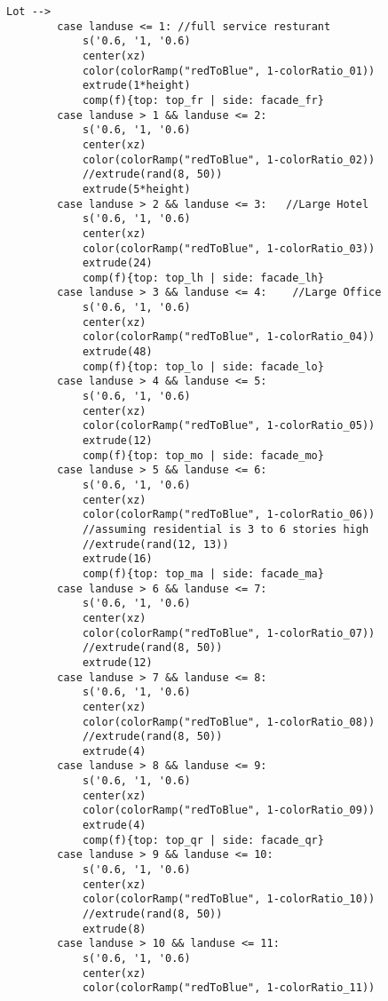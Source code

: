 \begin{multicols}{2}
\begin{verbatim}
Lot -->
        case landuse <= 1: //full service resturant
            s('0.6, '1, '0.6)
            center(xz)
            color(colorRamp("redToBlue", 1-colorRatio_01))
            extrude(1*height)
            comp(f){top: top_fr | side: facade_fr}
        case landuse > 1 && landuse <= 2:       
            s('0.6, '1, '0.6)
            center(xz)
            color(colorRamp("redToBlue", 1-colorRatio_02))
            //extrude(rand(8, 50))
            extrude(5*height)
        case landuse > 2 && landuse <= 3:   //Large Hotel
            s('0.6, '1, '0.6)
            center(xz)      
            color(colorRamp("redToBlue", 1-colorRatio_03))
            extrude(24)
            comp(f){top: top_lh | side: facade_lh}
        case landuse > 3 && landuse <= 4:    //Large Office
            s('0.6, '1, '0.6)
            center(xz)         
            color(colorRamp("redToBlue", 1-colorRatio_04))
            extrude(48)
            comp(f){top: top_lo | side: facade_lo}
        case landuse > 4 && landuse <= 5: 
            s('0.6, '1, '0.6)
            center(xz)
            color(colorRamp("redToBlue", 1-colorRatio_05))
            extrude(12)
            comp(f){top: top_mo | side: facade_mo}            
        case landuse > 5 && landuse <= 6: 
            s('0.6, '1, '0.6)
            center(xz)
            color(colorRamp("redToBlue", 1-colorRatio_06))
            //assuming residential is 3 to 6 stories high
            //extrude(rand(12, 13))
            extrude(16)
            comp(f){top: top_ma | side: facade_ma}          
        case landuse > 6 && landuse <= 7:
            s('0.6, '1, '0.6)
            center(xz)
            color(colorRamp("redToBlue", 1-colorRatio_07))
            //extrude(rand(8, 50))
            extrude(12)
        case landuse > 7 && landuse <= 8: 
            s('0.6, '1, '0.6)
            center(xz)
            color(colorRamp("redToBlue", 1-colorRatio_08))
            //extrude(rand(8, 50))
            extrude(4)
        case landuse > 8 && landuse <= 9: 
            s('0.6, '1, '0.6)
            center(xz)
            color(colorRamp("redToBlue", 1-colorRatio_09))
            extrude(4)
            comp(f){top: top_qr | side: facade_qr}            
        case landuse > 9 && landuse <= 10: 
            s('0.6, '1, '0.6)
            center(xz)
            color(colorRamp("redToBlue", 1-colorRatio_10))
            //extrude(rand(8, 50))
            extrude(8)
        case landuse > 10 && landuse <= 11: 
            s('0.6, '1, '0.6)
            center(xz)
            color(colorRamp("redToBlue", 1-colorRatio_11))

\end{verbatim}
\end{multicols}
